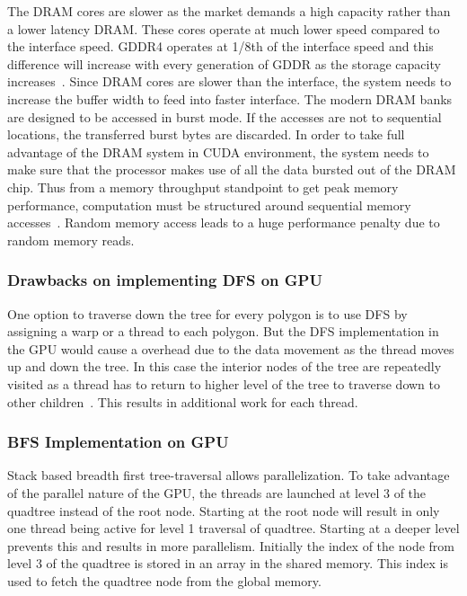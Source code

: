 The DRAM cores are slower as the market demands a high capacity rather than a lower latency DRAM.  These cores operate at much lower speed compared to the interface speed. GDDR4 operates at 1/8th of the interface speed and this difference will increase with every generation of GDDR as the storage capacity increases~\cite{Kirk:2010:PMP:1841511}.
Since DRAM cores are slower than the interface, the system needs to increase the buffer width to feed into faster interface. The modern DRAM banks are designed to be accessed in burst mode. If the accesses are not to sequential locations, the transferred burst bytes are discarded.
In order to take full advantage of the DRAM system in CUDA environment, the system needs to make sure that the processor makes use of all the data bursted out of the DRAM chip.
Thus from a memory throughput standpoint to get peak memory performance, computation must be structured around sequential memory accesses~\cite{Kirk:2010:PMP:1841511}. Random memory access leads to a huge performance penalty due to random memory reads.


\subsubsection{Drawbacks on implementing DFS on GPU}

One option to traverse down the tree for every polygon is to use DFS by assigning a warp or a thread to each polygon. But the DFS implementation in the GPU would cause a overhead due to the data movement as the thread moves up and down the tree. In this case the interior nodes of the tree are repeatedly visited as a thread has to return to higher level of the tree to traverse down to other children~\cite{goldfarb13sc}. This results in additional work for each thread.

\subsubsection{BFS Implementation on GPU}


Stack based breadth first tree-traversal allows parallelization. To take advantage of the parallel nature of the GPU, the threads are launched at level 3 of the quadtree instead of the root node. Starting at the root node will result in only one thread being active for level 1 traversal of quadtree. Starting at a deeper level prevents this and results in more parallelism.
Initially the index of the node from level 3 of the quadtree is stored in an array in the shared memory.
This index is used to fetch the quadtree node from the global memory.

